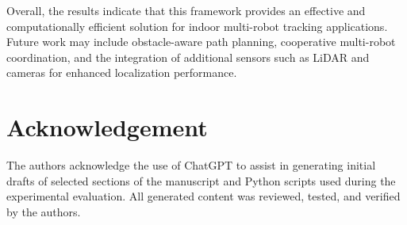 \documentclass[conference]{IEEEtran}
\begin{document}
Overall, the results indicate that this framework provides an effective and computationally efficient solution for indoor multi-robot tracking applications. Future work may include obstacle-aware path planning, cooperative multi-robot coordination, and the integration of additional sensors such as LiDAR and cameras for enhanced localization performance.


\section*{Acknowledgement}

The authors acknowledge the use of ChatGPT to assist in generating initial drafts of selected sections of the manuscript and Python scripts used during the experimental evaluation. All generated content was reviewed, tested, and verified by the authors.

\section*{}



\end{document}
